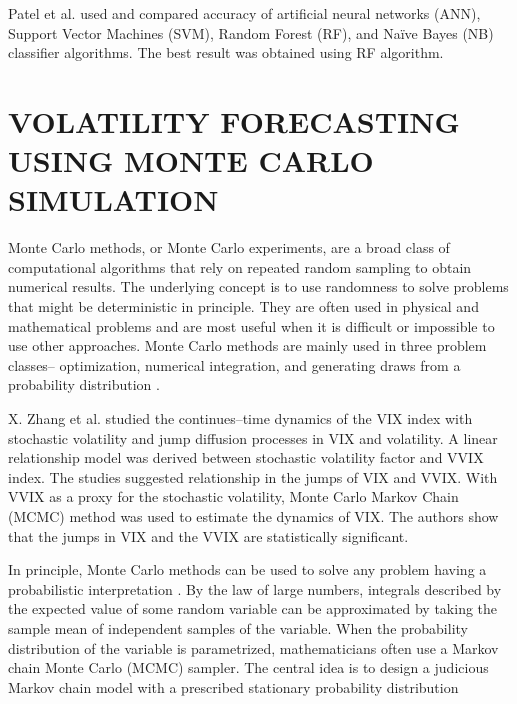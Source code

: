 \documentclass[12pt,a4paper]{report}
\numberwithin{equation}{section}
\begin{document}
Patel et al. \cite{patel2015predicting_34} used and compared accuracy of artificial neural
networks (ANN), Support Vector Machines (SVM), Random Forest (RF), and
Naïve Bayes (NB) classifier algorithms. The best result was obtained
using RF algorithm.

\hypertarget{volatility--forecasting--using--monte--carlo--simulation}{%
\section{\texorpdfstring{\textbf{VOLATILITY FORECASTING USING MONTE
CARLO
SIMULATION}}{VOLATILITY FORECASTING USING MONTE CARLO SIMULATION}}\label{volatility--forecasting--using--monte--carlo--simulation}}

Monte Carlo methods, or Monte Carlo experiments, are a broad class of
computational algorithms that rely on repeated random sampling to obtain
numerical results. The underlying concept is to use randomness to solve
problems that might be deterministic in principle. They are often used
in physical and mathematical problems and are most useful when it is
difficult or impossible to use other approaches. Monte Carlo methods are
mainly used in three problem classes-- optimization, numerical
integration, and generating draws from a probability distribution
\cite{kroese2014why_38}.

X. Zhang et al. \cite{zhang2015doublejump_39} studied the continues--time dynamics of the VIX
index with stochastic volatility and jump diffusion processes in VIX and
volatility. A linear relationship model was derived between stochastic
volatility factor and VVIX index. The studies suggested relationship in
the jumps of VIX and VVIX. With VVIX as a proxy for the stochastic
volatility, Monte Carlo Markov Chain (MCMC) method was used to estimate
the dynamics of VIX. The authors show that the jumps in VIX and the VVIX
are statistically significant.

In principle, Monte Carlo methods can be used to solve any problem
having a probabilistic interpretation \cite{muralidhar2003monte_40}. By the law of large
numbers, integrals described by the expected value of some random
variable can be approximated by taking the sample mean of independent
samples of the variable. When the probability distribution of the
variable is parametrized, mathematicians often use a Markov chain Monte
Carlo (MCMC) sampler. The central idea is to design a judicious Markov
chain model with a prescribed stationary probability distribution
\cite{hastings1970monte_41}
\end{document}
